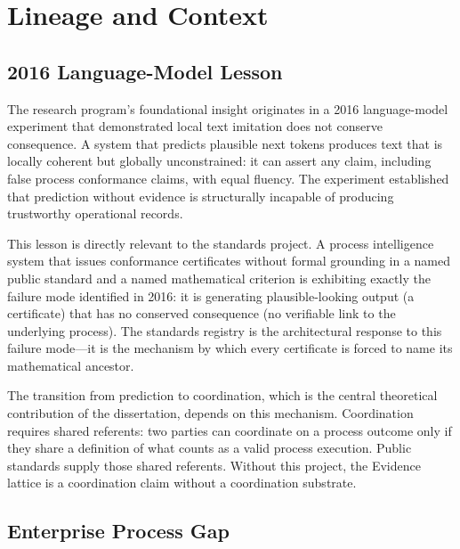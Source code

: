 
\section{Lineage and Context}
\label{sec:standards-lineage}

\subsection{2016 Language-Model Lesson}
\label{sec:standards-lineage-2016}

The research program's foundational insight originates in a 2016 language-model experiment
that demonstrated local text imitation does not conserve consequence. A system that
predicts plausible next tokens produces text that is locally coherent but globally
unconstrained: it can assert any claim, including false process conformance claims, with
equal fluency. The experiment established that prediction without evidence is structurally
incapable of producing trustworthy operational records.

This lesson is directly relevant to the standards project. A process intelligence system
that issues conformance certificates without formal grounding in a named public standard
and a named mathematical criterion is exhibiting exactly the failure mode identified in
2016: it is generating plausible-looking output (a certificate) that has no conserved
consequence (no verifiable link to the underlying process). The standards registry is
the architectural response to this failure mode---it is the mechanism by which every
certificate is forced to name its mathematical ancestor.

The transition from prediction to coordination, which is the central theoretical
contribution of the dissertation, depends on this mechanism. Coordination requires shared
referents: two parties can coordinate on a process outcome only if they share a definition
of what counts as a valid process execution. Public standards supply those shared
referents. Without this project, the Evidence lattice is a coordination claim without
a coordination substrate.

\subsection{Enterprise Process Gap}
\label{sec:standards-lineage-enterprise-gap}

